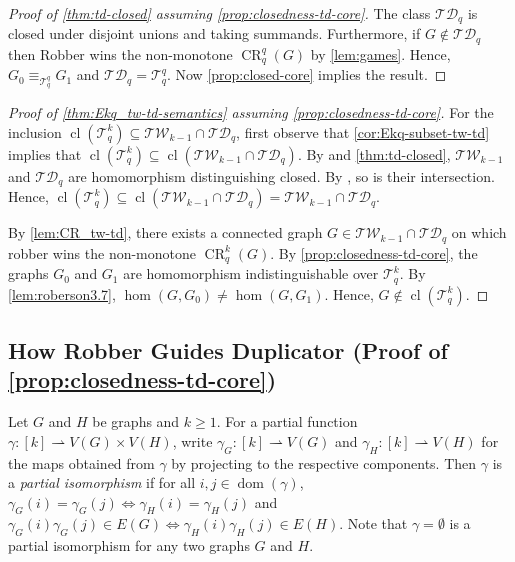 \documentclass[a4paper,UKenglish,cleveref, autoref, thm-restate]{lipics-v2021}
\newcommand{\Ekq}{\ensuremath{\mathcal{T}_{q}^{k}}}
\DeclareMathOperator{\CR}{CR}
\DeclareMathOperator{\dom}{dom}
\DeclareMathOperator{\cl}{cl}
\begin{document}
\begin{proof}[Proof of \cref{thm:td-closed} assuming \cref{prop:closedness-td-core}]
	The class $\mathcal{TD}_q$ is closed under disjoint unions and taking summands.
	Furthermore, if $G \not\in \mathcal{TD}_q$ then Robber wins the non-monotone $\CR^q_q(G)$ by \cref{lem:games}. Hence, $G_0 \equiv_{\mathcal{T}_q^q} G_1$ and $\mathcal{TD}_q = \mathcal{T}_q^q$.
	Now \cref{prop:closed-core} implies the result.
\end{proof}

\begin{proof}[Proof of \cref{thm:Ekq_tw-td-semantics} assuming \cref{prop:closedness-td-core}]
	For the inclusion $\cl(\Ekq) \subseteq \mathcal{TW}_{k-1} \cap \mathcal{TD}_q$, first observe that \cref{cor:Ekq-subset-tw-td} implies that $\cl(\Ekq) \subseteq \cl(\mathcal{TW}_{k-1} \cap \mathcal{TD}_q)$.
	By \cite{neuen_homomorphism-distinguishing_2023} and \cref{thm:td-closed}, $\mathcal{TW}_{k-1}$ and $\mathcal{TD}_q$ are homomorphism distinguishing closed. By \cite[Lemma~6.1]{roberson_oddomorphisms_2022}, so is their intersection. Hence, $\cl(\Ekq) \subseteq \cl(\mathcal{TW}_{k-1} \cap \mathcal{TD}_q) = \mathcal{TW}_{k-1} \cap \mathcal{TD}_q$.
	
	By \cref{lem:CR_tw-td}, there exists a connected graph $G \in \mathcal{TW}_{k-1} \cap \mathcal{TD}_q$ on which robber wins the non-monotone $\CR^k_q(G)$. By \cref{prop:closedness-td-core}, the graphs $G_0$ and $G_1$ are homomorphism indistinguishable over $\Ekq$. By \cref{lem:roberson3.7}, $\hom(G, G_0) \neq \hom(G, G_1)$. Hence, $G \not\in \cl(\Ekq)$.
\end{proof}

\subsection{How Robber Guides Duplicator (Proof of \cref{prop:closedness-td-core})}


Let $G$ and $H$ be graphs and $k \geq 1$.
For a partial function $\gamma \colon [k] \rightharpoonup V(G) \times V(H)$, write $\gamma_G \colon [k] \rightharpoonup V(G)$ and $\gamma_H \colon [k] \rightharpoonup V(H)$ for the maps obtained from $\gamma$ by projecting to the respective components. Then $\gamma$ is a \emph{partial isomorphism} if for all $i, j \in \dom(\gamma)$, $\gamma_G(i) = \gamma_G(j) \Leftrightarrow \gamma_H(i) = \gamma_H(j)$ and $\gamma_G(i)\gamma_G(j) \in E(G) \Leftrightarrow \gamma_H(i)\gamma_H(j) \in E(H)$. Note that $\gamma = \emptyset$ is a partial isomorphism for any two graphs $G$ and $H$.
\end{document}
